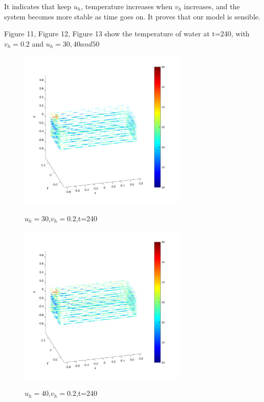 \documentclass[12pt,a4paper,titlepage]{article}
\begin{document}
It indicates that keep $u_h$, temperature increases when $v_h$ increases, and the system becomes more stable as time goes on. It proves that our model is sensible.

  
Figure 11, Figure 12, Figure 13 show the temperature of water at t=240, with $v_h=0.2$ and $u_h=30, 40 and 50$

\begin{figure}[htb]
  \centering
  \includegraphics[width=8cm]{8-2.pdf}\\
  \caption{$u_h=30$,$v_h=0.2$,t=240}\label{8-2_p}
\end{figure}

\begin{figure}[htb]
  \centering
  \includegraphics[width=8cm]{10-2.pdf}\\
  \caption{$u_h=40$,$v_h=0.2$,t=240}\label{10-2_p}
\end{figure}
\end{document}
